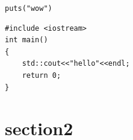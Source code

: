 \verb|puts("wow")| %

\par
\lstset{language=C++}
\begin{lstlisting}[caption = code demo]
#include <iostream>
int main()
{
    std::cout<<"hello"<<endl;
    return 0;
}
\end{lstlisting}
\section{section2}